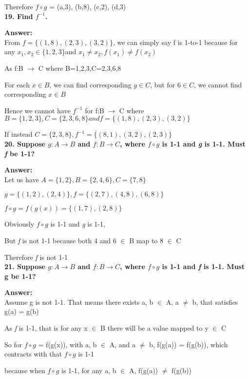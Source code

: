 \documentclass{article}
\begin{document}
\begin{large}
Therefore $f \circ g$ = {(a,3), (b,8), (c,2), (d,3)}\\


\textbf{19. Find $f^{-1}$.}

\textbf{Answer:} \\

From $f=\{(1,8),(2,3),(3,2)\}$, we can simply say f is 1-to-1 because for any $x_{1}, x_{2} \in \{1,2,3\} $and $x_{1} \neq x_{2}, f(x_{1}) \neq f(x_{2})$

As f:B $\to$ C where B={1,2,3},C={2,3,6,8}

For each $x \in B$, we can find corresponding $y \in C$, but for $6 \in C$, we cannot find corresponding $x \in B$

Hence we cannot have $f^{-1}$ for f:B $\to$ C where $B=\{1,2,3\},C=\{2,3,6,8\} and f=\{(1,8),(2,3),(3,2)\}$

If instead $C = \{2,3,8\}, f^{-1} = \{(8,1),(3,2),(2,3)\}$\\


\textbf{20. Suppose $g:A\to B$ and $f:B\to C$, where $f\circ g$ is 1-1 and \emph{g} is 1-1. Must \emph{f} be 1-1?}

\textbf{Answer:} \\

Let us have $A = \{1,2\}, B = \{2,4,6\}, C = \{7,8\}$

$g = \{(1,2), (2,4)\}, f = \{(2,7), (4,8), (6,8)\}$

$f\circ g = f(g(x)) = \{(1,7), (2,8)\}$

Obviously $f\circ g$ is 1-1 and \emph{g} is 1-1,

But \emph{f} is not 1-1 because both 4 and 6 $\in$ B map to 8 $\in$ C

Therefore \emph{f} is not 1-1\\


\textbf{21. Suppose $g:A\to B$ and $f:B\to C$, where $f\circ g$ is 1-1 and \emph{f} is 1-1. Must g be 1-1?}

\textbf{Answer:} \\

Assume g is not 1-1. That means there exists a, b $\in$ A, a $\neq$ b, that satisfies g(a) = g(b)

As \emph{f} is 1-1, that is for any x $\in$ B there will be a value mapped to y $\in$ C

So for $f\circ g$ = f(g(x)), with a, b $\in$ A, and a $\neq$ b, f(g(a)) = f(g(b)), which contracts with that $f\circ g$ is 1-1

because when $f\circ g$ is 1-1, for any a, b $\in$ A, f(g(a)) $\neq$ f(g(b))


\end{large}
\end{document}
